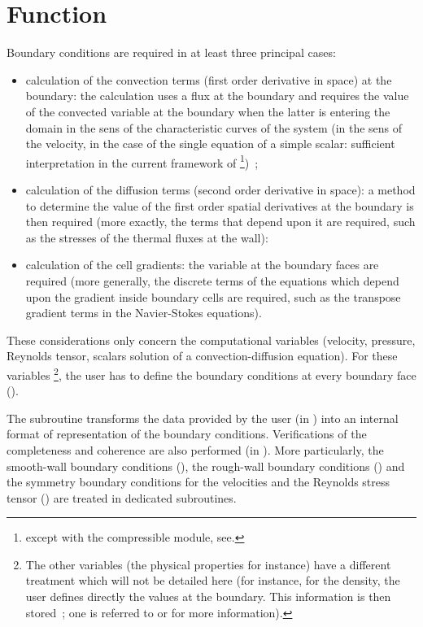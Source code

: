 \section*{Function}
Boundary conditions are required in at least three principal cases:
\begin{itemize}
\item calculation of the convection terms (first order derivative in space) at
the boundary: the calculation uses a flux at the boundary and requires the
value of the convected variable at the boundary when the latter is entering
the domain in the sens of the characteristic curves of the system (in the sens
of the velocity, in the case of the single equation of a simple scalar:
 sufficient interpretation in the current framework of
\CS\footnote{except with the compressible module, see. })~;
\item calculation of the diffusion terms (second order derivative
in space):
a method to determine the value of the first order spatial derivatives
at the boundary is then required
 (more exactly, the terms that depend upon it are required,
 such as the stresses of the thermal fluxes at the wall):
\item calculation of the cell  gradients: the variable at the boundary faces
 are required (more generally, the discrete terms of the equations which depend
upon the gradient inside boundary cells are required, such as the transpose
gradient terms in the Navier-Stokes equations).
\end{itemize}
These considerations only concern the computational variables
(velocity, pressure, Reynolds tensor,
scalars solution of a convection-diffusion equation). For these variables
\footnote{
The other variables
(the physical properties for instance) have a different treatment which will
not be detailed here (for instance, for the density, the user defines
directly the values at the boundary. This information is then stored~; one
is referred to  or  for more information).
},
the user has to define the boundary conditions at every boundary face
().


The  subroutine transforms the data provided by the user
(in ) into an internal format of representation of the boundary
 conditions. Verifications of the completeness and coherence are also
performed (in ). More particularly, the smooth-wall boundary conditions
 (), the rough-wall boundary conditions ()
and the symmetry boundary conditions for the velocities and
the Reynolds stress tensor () are treated in dedicated subroutines.

